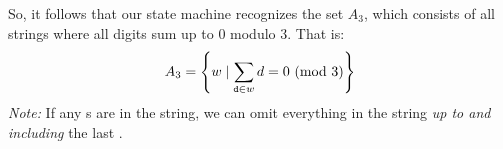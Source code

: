 \documentclass[letterpaper]{article}
\begin{document}
\bigskip

So, it follows that our state machine recognizes the set $A_3$, which consists of all strings where all digits sum up to 0 modulo 3. That is: 
\[A_3 = \left\{w \mid \sum_{\texttt{d} \in w} d = 0 \ (\mathrm{mod}\ 3)\right\}\]
\emph{Note:} If any s are in the string, we can omit everything in the string \emph{up to and including} the last .
\end{document}
